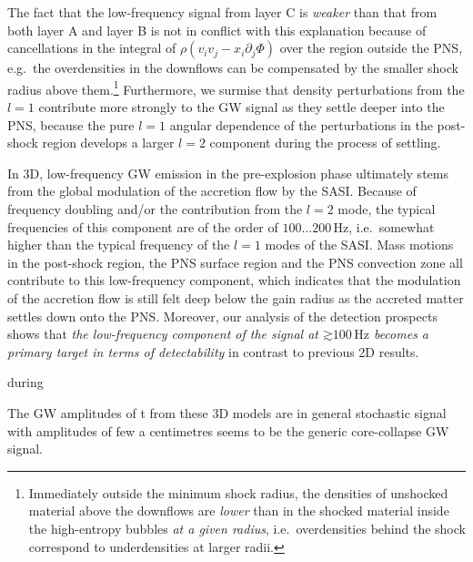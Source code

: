 The fact that the low-frequency signal from layer C
is \emph{weaker} than that from both layer A and layer B
is not in conflict with this explanation
because of cancellations in
the integral of $ \rho \left ( v_i v_j - x_i \partial_j \Phi \right) $
over the region outside the PNS, e.g.\ the overdensities in
the downflows can be compensated by the smaller shock radius
above them.\footnote{Immediately outside the minimum shock radius, the densities
of unshocked material above the downflows are \emph{lower} than in the shocked
material inside the high-entropy bubbles \emph{at a given radius}, i.e.\ overdensities
behind the shock correspond to underdensities at larger radii.}
Furthermore, we surmise that
density perturbations from the $l=1$ contribute more strongly to
the GW signal as they settle deeper into the PNS, because the pure
$l=1$ angular dependence of the perturbations in the post-shock
region develops a larger $l=2$ component during the process of settling.








\item In 3D, low-frequency GW emission in the pre-explosion phase
  ultimately stems from the global modulation of the accretion flow by
  the SASI. Because of frequency doubling and/or the contribution
  from the $l=2$ mode, the typical frequencies of this component are
  of the order of $100 \ldots 200 \, \mathrm{Hz}$, i.e.\ somewhat
  higher than the typical frequency of the $l=1$ modes of the SASI.
  Mass motions in the post-shock region, the PNS surface
  region and the PNS convection zone all contribute to this
  low-frequency component, which indicates that the modulation of the
  accretion flow is still felt deep below the gain radius as the accreted
  matter settles down onto the PNS.
  Moreover, our analysis of the detection prospects shows that 
\emph{the low-frequency component of the signal at $\mathord{\gtrsim} 100 \, \mathrm{Hz}$
 becomes a primary target in terms of detectability} in contrast to previous 2D results.     



 during


The GW amplitudes of t from these 3D models are in general stochastic signal with amplitudes of few a centimetres seems to be the generic core-collapse GW signal.

